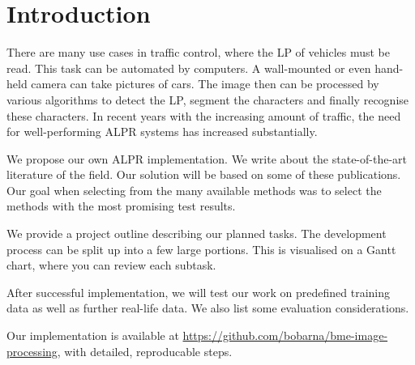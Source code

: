 \section{Introduction}

There are many use cases in traffic control, where the \ac{LP} of vehicles must
be read.  This task can be automated by computers. A wall-mounted or even
hand-held camera can take pictures of cars. The image then can be processed by
various algorithms to detect the \ac{LP}, segment the characters and finally
recognise these characters.  In recent years with the increasing amount of
traffic, the need for well-performing \ac{ALPR} systems has increased
substantially.

We propose our own \ac{ALPR} implementation.  We write about the
state-of-the-art literature of the field. Our solution will be based on some of
these publications. Our goal when selecting from the many available methods was
to select the methods with the most promising test results.

We provide a project outline describing our planned tasks. The development
process can be split up into a few large portions. This is visualised on a Gantt
chart, where you can review each subtask.

After successful implementation, we will test our work on predefined training
data as well as further real-life data. We also list some evaluation
considerations.

Our implementation is available at
\url{https://github.com/bobarna/bme-image-processing}, with detailed,
reproducable steps.

